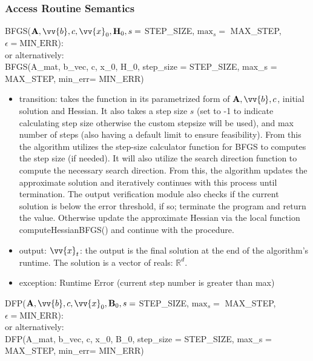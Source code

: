 \documentclass[12pt, titlepage]{article}
\begin{document}
\subsubsection{Access Routine Semantics}


BFGS($\mathbf{A}, \vv{b}, c, \vv{x}_{0}, \mathbf{H}_{0}, s = $ STEP\_SIZE, $\text{max}_s =$ MAX\_STEP, $\epsilon=\text{MIN\_ERR}$):
\\
or alternatively:
\\
BFGS(A\_mat, b\_vec, c, x\_0, H\_0, step\_size = STEP\_SIZE, max\_s = MAX\_STEP, min\_err= MIN\_ERR)
\begin{itemize}
\item transition: takes the function in its parametrized form of $\mathbf{A},\vv{b},c$, initial solution and Hessian. It also takes a step size $s$ (set to -1 to indicate calculating step size otherwise the custom stepsize will be used), and max number of steps (also having a default limit to ensure feasibility). From this the algorithm utilizes the step-size calculator function for BFGS to computes the step size (if needed). It will also utilize the search direction function to compute the necessary search direction. From this, the algorithm updates the approximate solution and iteratively continues with this process until termination. The output verification module also checks if the current solution is below the error threshold, if so; terminate the program and return the value. Otherwise update the approximate Hessian via the local function computeHessianBFGS() and continue with the procedure.
\item output: $\vv{x}_t$: the output is the final solution at the end of the algorithm's runtime. The solution is a vector of reals: $\mathbb{R}^d$.  
\item exception: Runtime Error (current step number is greater than max) 
\end{itemize}
DFP($\mathbf{A}, \vv{b}, c, \vv{x}_{0}, \mathbf{B}_{0}, s = $ STEP\_SIZE, $\text{max}_s =$ MAX\_STEP, $\epsilon=\text{MIN\_ERR}$):
\\
or alternatively:
\\
DFP(A\_mat, b\_vec, c, x\_0, B\_0, step\_size = STEP\_SIZE, max\_s = MAX\_STEP, min\_err= MIN\_ERR)
\end{document}
